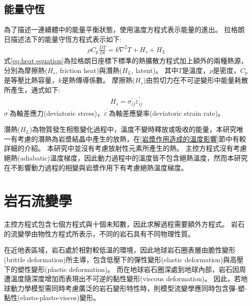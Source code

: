 \subsection{能量守恆}
為了描述一連續體中的能量平衡狀態，使用溫度方程式表示能量的進出。
拉格朗日描述法下的能量守恆方程式表示如下:
\begin{align}
\rho C_p \frac{DT}{Dt} = k\nabla^2T+H_s+H_L
\label{eq:heat equation}
\end{align}
式\ref{eq:heat equation}為拉格朗日座標下標準的熱擴散方程式加上額外的兩種熱源，分別為摩擦熱($H_s$, friction heat)與潛熱($H_L$, latent)。
其中$T$是溫度，$\rho$是密度，$C_p$是等壓比熱容量，$k$是熱傳導係數。
摩擦熱($H_s$)由剪切力在不可逆變形中能量耗散所產生，通式如下:
\begin{align}
    H_s = \sigma^{'}_{ij}\dot\varepsilon^{'}_{ij}
\end{align}
$\sigma^{'}$為軸差應力(deviatoric stress)，$\dot\varepsilon^{'}$為軸差應變率(deviatoric strain rate)。

潛熱($H_L$)為物質發生相態變化過程中，溫度不變時釋放或吸收的能量，本研究唯一有考慮的潛熱為岩漿結晶中產生的放熱，在\ref{岩漿作用造成的溫度影響}節中有較詳細的介紹。
本研究中並沒有考慮放射性元素所產生的熱。
主控方程式沒有考慮絕熱(adiabatic)溫度梯度，因此動力過程中的溫度皆不包含絕熱溫度，然而本研究在不影響動力過程的相變與岩漿作用下有考慮絕熱溫度梯度。

\section{岩石流變學}
主控方程式包含七個方程式與十個未知數，因此求解過程需要額外方程式。
岩石的流變學由物性方程式所表示，不同的岩石具有不同物理性質。

在近地表區域，岩石處於相對較低溫的環境，因此地球岩石圈表層由脆性變形(brittle deformation)所主導，包含低壓下的彈性變形(elastic deformation)與高壓下的塑性變形(plastic deformation)。
而在地球岩石圈深處到地球內部，岩石因周遭溫度隨深度增加而表現出不可逆的黏性變形(viscous deformation)。
因此，若地球動力學模型需同時考慮廣泛的岩石變形特性時，則模型流變學應同時包含彈-塑-黏性(elasto-plasto-viscos)變形。

